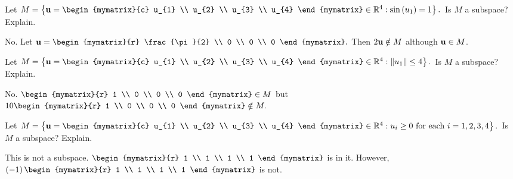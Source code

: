 \begin{enumialphparenastyle}
\begin{ex} Let $M=\set{\vect{u}=\begin{mymatrix}{c}
u_{1} \\
u_{2} \\
u_{3} \\
u_{4}
\end{mymatrix} \in 
\R^{4}:\sin \tup{u_{1}} =1} .$ Is $M$ a subspace?
Explain.
\begin{sol}
No. Let $\vect{u}=\begin{mymatrix}{r}
\frac{\pi }{2} \\
0 \\
0 \\
0
\end{mymatrix} .$ Then $2{\bf u}\notin M$ although ${\bf u}\in M$.
\end{sol}
\end{ex}

\begin{ex} Let $M=\set{\vect{u}=\begin{mymatrix}{c}
u_{1} \\
u_{2} \\
u_{3} \\
u_{4}
\end{mymatrix} \in 
\R^{4}:\vectlength u_{1}\vectlength \leq 4} .$ Is $M$ a
subspace? Explain.
\begin{sol}
No. $\begin{mymatrix}{r}
1 \\
0 \\
0 \\
0
\end{mymatrix} \in M$ but $10\begin{mymatrix}{r}
1 \\
0 \\
0 \\
0
\end{mymatrix} \notin M.$
\end{sol}
\end{ex}

\begin{ex} Let $M=\set{\vect{u}=\begin{mymatrix}{c}
u_{1} \\
u_{2} \\
u_{3} \\
u_{4}
\end{mymatrix} \in 
\R^{4}:u_{i}\geq 0\text{ for each }i=1,2,3,4} .$ Is $M$ a
subspace? Explain.
\begin{sol}
This is not a subspace. $\begin{mymatrix}{r}
1 \\
1 \\
1 \\
1
\end{mymatrix} $
is in it. However, $\tup{-1} \begin{mymatrix}{r}
1 \\
1 \\
1 \\
1
\end{mymatrix} $ is not.
\end{sol}
\end{ex}


\end{enumialphparenastyle}
